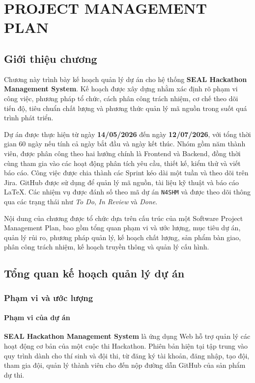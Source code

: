 \chapter{PROJECT MANAGEMENT PLAN}

\section{Giới thiệu chương}

Chương này trình bày kế hoạch quản lý dự án cho hệ thống \textbf{SEAL Hackathon Management System}. Kế hoạch được xây dựng nhằm xác định rõ phạm vi công việc, phương pháp tổ chức, cách phân công trách nhiệm, cơ chế theo dõi tiến độ, tiêu chuẩn chất lượng và phương thức quản lý mã nguồn trong suốt quá trình phát triển.

Dự án được thực hiện từ ngày \textbf{14/05/2026} đến ngày \textbf{12/07/2026}, với tổng thời gian 60 ngày nếu tính cả ngày bắt đầu và ngày kết thúc. Nhóm gồm năm thành viên, được phân công theo hai hướng chính là Frontend và Backend, đồng thời cùng tham gia vào các hoạt động phân tích yêu cầu, thiết kế, kiểm thử và viết báo cáo. Công việc được chia thành các Sprint kéo dài một tuần và theo dõi trên Jira. GitHub được sử dụng để quản lý mã nguồn, tài liệu kỹ thuật và báo cáo LaTeX. Các nhiệm vụ được đánh số theo mã dự án \texttt{N4SHM} và được theo dõi thông qua các trạng thái như \textit{To Do}, \textit{In Review} và \textit{Done}.

Nội dung của chương được tổ chức dựa trên cấu trúc của một Software Project Management Plan, bao gồm tổng quan phạm vi và ước lượng, mục tiêu dự án, quản lý rủi ro, phương pháp quản lý, kế hoạch chất lượng, sản phẩm bàn giao, phân công trách nhiệm, kế hoạch truyền thông và quản lý cấu hình.

\section{Tổng quan kế hoạch quản lý dự án}

\subsection{Phạm vi và ước lượng}

\subsubsection{Phạm vi của dự án}

\textbf{SEAL Hackathon Management System} là ứng dụng Web hỗ trợ quản lý các hoạt động cơ bản của một cuộc thi Hackathon. Phiên bản hiện tại tập trung vào quy trình dành cho thí sinh và đội thi, từ đăng ký tài khoản, đăng nhập, tạo đội, tham gia đội, quản lý thành viên cho đến nộp đường dẫn GitHub của sản phẩm dự thi.


